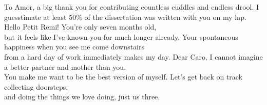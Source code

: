 To Amor, a big thank you for contributing countless cuddles and endless drool.
I guesstimate at least 50\% of the dissertation was written with you on my lap.
Hello Petit Remi! You're only seven months old,\\but it feels like I've known you for much longer already.
Your spontaneous happiness when you see me come downstairs\\from a hard day of work immediately makes my day.
Dear Caro, I cannot imagine a better partner and mother than you.\\You make me want to be the best version of myself.
Let's get back on track collecting doorsteps,\\and doing the things we love doing, just us three.
























































































